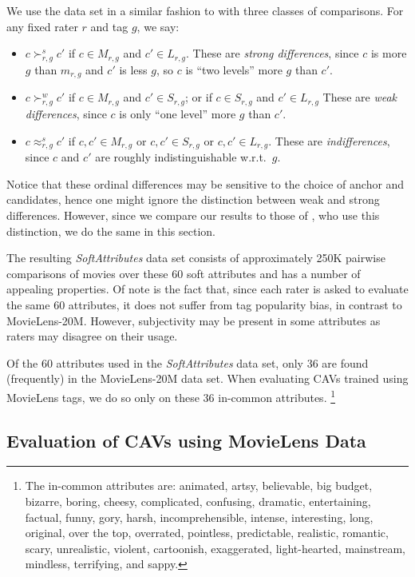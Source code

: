 \documentclass[manuscript,screen,nonacm]{acmart}
\newcommand{\1}{{\mathbf 1}}
\theoremstyle{TheoremNum}
\begin{document}
We use the data set in a similar fashion to \citet{sigir21:filipandkristian} with three classes of comparisons. For any fixed rater $r$ and tag $g$, we say:
\begin{itemize}
    \item $c \succ^s_{r,g} c'$ if $c\in M_{r,g}$ and $c' \in L_{r,g}$. These are \emph{strong differences}, since $c$ is more $g$ than $m_{r,g}$ and $c'$ is less $g$, so $c$ is ``two levels'' more $g$ than $c'$.
    \item $c \succ^w_{r,g} c'$ if $c\in M_{r,g}$ and $c' \in S_{r,g}$; or if $c\in S_{r,g}$ and $c' \in L_{r,g}$ These are \emph{weak differences}, since $c$ is only ``one level'' more $g$ than $c'$. 
    \item $c \approx^s_{r,g} c'$ if $c,c'\in M_{r,g}$ or $c,c' \in S_{r,g}$ or $c,c' \in L_{r,g}$.
    These are \emph{indifferences}, since $c$ and $c'$ are roughly indistinguishable w.r.t.\  $g$. 
\end{itemize}
Notice that these ordinal differences may be sensitive to the choice of anchor and candidates, hence one might ignore the distinction between weak and strong differences. However, since we compare our results to those of \citet{sigir21:filipandkristian}, who use this distinction, we do the same in this section.

The resulting \emph{SoftAttributes} data set consists of approximately 250K pairwise comparisons of movies over these 60 soft attributes and has a number of appealing properties. Of note is the fact that, since  each rater is asked to evaluate the same $60$ attributes, it does not suffer from tag popularity bias, in contrast to MovieLens-20M. However, subjectivity may be present in some attributes as raters may disagree on their usage.

Of the $60$ attributes used in the \emph{SoftAttributes} data set, only $36$ are found (frequently) in the MovieLens-20M data set.
When evaluating CAVs trained using MovieLens tags, we do so only on these 36 in-common attributes.
\footnote{
The in-common attributes are: 
animated,
artsy,
believable,
big budget,
bizarre,
boring,
cheesy,
complicated,
confusing,
dramatic,
entertaining,
factual,
funny,
gory,
harsh,
incomprehensible,
intense,
interesting,
long,
original,
over the top,
overrated,
pointless,
predictable,
realistic,
romantic,
scary,
unrealistic,
violent,
cartoonish,
exaggerated,
light-hearted,
mainstream,
mindless,
terrifying, and
sappy.
}




\subsection{Evaluation of CAVs using MovieLens Data}
\label{sec:ratereval_MovieLens}
\end{document}
